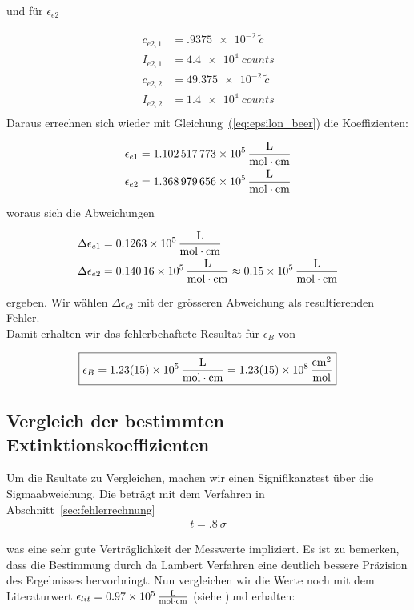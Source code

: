 \documentclass{article}
\let\OrigRef\ref
\renewcommand{\ref}[1]{{\color{linkblue}\uline{\OrigRef{#1}}}}
\renewcommand{\eqref}[1]{{\color{linkblue}\uline{\textup{(\OrigRef{#1})}}}}
\begin{document}
und für  $\epsilon_{e2}$

\begin{align}
	c_{e2,1} &= \qty{.9375e-2}{\tilde{c}}\\
	I_{e2,1} &= \qty{4.4e4}{counts}\\
	c_{e2,2} &= \qty{49.375e-2}{\tilde{c}}\\
	I_{e2,2} &= \qty{1.4e4}{counts}\\
\end{align}
Daraus errechnen sich wieder mit Gleichung~\eqref{eq:epsilon_beer} die Koeffizienten:

\begin{align}
	\epsilon_{e1} &= \qty{1.102517773e5}{\frac{\liter}{\mol \cdot cm}}\\
	\epsilon_{e2} &= \qty{1.368979656e5}{\frac{\liter}{\mol \cdot cm}}
\end{align}

woraus sich die Abweichungen

\begin{align}
	\Delta \epsilon_{e1} &= \qty{0.1263e5}{\frac{\liter}{\mol \cdot cm}}\\
	\Delta \epsilon_{e2} &= \qty{0.14016e5}{\frac{\liter}{\mol \cdot cm}} \approx \qty{0.15e5}{\frac{\liter}{\mol \cdot cm}}
\end{align}

ergeben. Wir wählen $\Delta \epsilon_{e2}$ mit der grösseren Abweichung als 
resultierenden Fehler.\\ 
Damit erhalten wir das fehlerbehaftete Resultat für $\epsilon_B$ von

\begin{align}
	\boxed{
		\epsilon_B = \qty{1.23(.15)e5}{\frac{\liter}{\mol \cdot cm}}
		= \qty{1.23(15)e8}{\frac{cm^2}{\mol}}
	}
	\label{eq:res-beer}
\end{align}

\subsection{Vergleich der bestimmten Extinktionskoeffizienten}

Um die Rsultate zu Vergleichen, machen wir einen Signifikanztest über
die Sigmaabweichung. Die beträgt mit dem Verfahren in Abschnitt~\ref{sec:fehlerrechnung}
\begin{align}
	\boxed{
		t = \qty{.8}{\sigma}
	}	
\end{align}

was eine sehr gute Verträglichkeit der Messwerte impliziert. Es ist zu bemerken, 
dass die Bestimmung durch da Lambert Verfahren eine deutlich bessere Präzision 
des Ergebnisses hervorbringt. Nun vergleichen wir die Werte noch mit dem Literaturwert
$\epsilon_{lit} = \qty{.97e5}{\frac{\liter}{\mol \cdot cm}}$ (siehe \cite{chebotarev2017})und erhalten:
\end{document}
